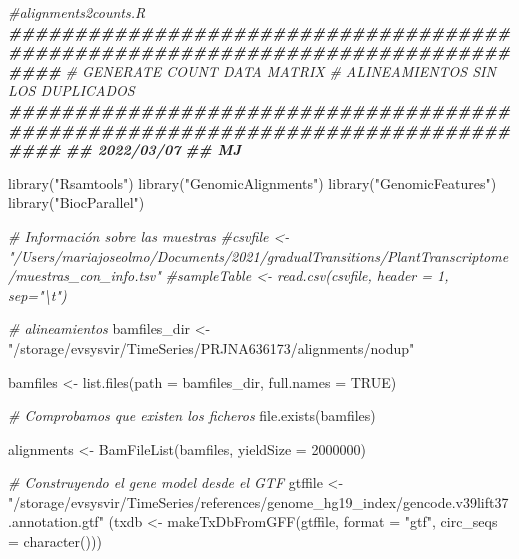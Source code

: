 \documentclass[
]{book}
\newenvironment{Shaded}{\begin{snugshade}}{\end{snugshade}}
\newcommand{\AttributeTok}[1]{\textcolor[rgb]{0.77,0.63,0.00}{#1}}
\newcommand{\CommentTok}[1]{\textcolor[rgb]{0.56,0.35,0.01}{\textit{#1}}}
\newcommand{\ConstantTok}[1]{\textcolor[rgb]{0.00,0.00,0.00}{#1}}
\newcommand{\DecValTok}[1]{\textcolor[rgb]{0.00,0.00,0.81}{#1}}
\newcommand{\DocumentationTok}[1]{\textcolor[rgb]{0.56,0.35,0.01}{\textbf{\textit{#1}}}}
\newcommand{\FunctionTok}[1]{\textcolor[rgb]{0.00,0.00,0.00}{#1}}
\newcommand{\NormalTok}[1]{#1}
\newcommand{\OtherTok}[1]{\textcolor[rgb]{0.56,0.35,0.01}{#1}}
\newcommand{\StringTok}[1]{\textcolor[rgb]{0.31,0.60,0.02}{#1}}
\begin{document}
\begin{Shaded}
\begin{Highlighting}[]
\CommentTok{\#alignments2counts.R}
\DocumentationTok{\#\#\#\#\#\#\#\#\#\#\#\#\#\#\#\#\#\#\#\#\#\#\#\#\#\#\#\#\#\#\#\#\#\#\#\#\#\#\#\#\#\#\#\#\#\#\#\#\#\#\#\#\#\#\#\#\#\#\#\#\#\#\#\#\#\#\#\#\#\#\#\#\#\#\#\#\#\#\#\#}
\CommentTok{\# GENERATE COUNT DATA MATRIX}
\CommentTok{\# ALINEAMIENTOS SIN LOS DUPLICADOS}
\DocumentationTok{\#\#\#\#\#\#\#\#\#\#\#\#\#\#\#\#\#\#\#\#\#\#\#\#\#\#\#\#\#\#\#\#\#\#\#\#\#\#\#\#\#\#\#\#\#\#\#\#\#\#\#\#\#\#\#\#\#\#\#\#\#\#\#\#\#\#\#\#\#\#\#\#\#\#\#\#\#\#\#\#}
\DocumentationTok{\#\# 2022/03/07}
\DocumentationTok{\#\# MJ}

\FunctionTok{library}\NormalTok{(}\StringTok{"Rsamtools"}\NormalTok{)}
\FunctionTok{library}\NormalTok{(}\StringTok{"GenomicAlignments"}\NormalTok{)}
\FunctionTok{library}\NormalTok{(}\StringTok{"GenomicFeatures"}\NormalTok{)}
\FunctionTok{library}\NormalTok{(}\StringTok{"BiocParallel"}\NormalTok{)}

\CommentTok{\# Información sobre las muestras}
\CommentTok{\#csvfile \textless{}{-} "/Users/mariajoseolmo/Documents/2021/gradualTransitions/PlantTranscriptome/muestras\_con\_info.tsv"}
\CommentTok{\#sampleTable \textless{}{-} read.csv(csvfile, header = 1, sep="\textbackslash{}t")}

\CommentTok{\# alineamientos}
\NormalTok{bamfiles\_dir }\OtherTok{\textless{}{-}} \StringTok{"/storage/evsysvir/TimeSeries/PRJNA636173/alignments/nodup"}

\NormalTok{bamfiles }\OtherTok{\textless{}{-}} \FunctionTok{list.files}\NormalTok{(}\AttributeTok{path =}\NormalTok{ bamfiles\_dir, }\AttributeTok{full.names =} \ConstantTok{TRUE}\NormalTok{)}

\CommentTok{\# Comprobamos que existen los ficheros}
\FunctionTok{file.exists}\NormalTok{(bamfiles)}

\NormalTok{alignments }\OtherTok{\textless{}{-}} \FunctionTok{BamFileList}\NormalTok{(bamfiles,}
                          \AttributeTok{yieldSize =} \DecValTok{2000000}\NormalTok{)}


\CommentTok{\# Construyendo el gene model desde el GTF}
\NormalTok{gtffile }\OtherTok{\textless{}{-}} \StringTok{"/storage/evsysvir/TimeSeries/references/genome\_hg19\_index/gencode.v39lift37.annotation.gtf"}
\NormalTok{(txdb }\OtherTok{\textless{}{-}} \FunctionTok{makeTxDbFromGFF}\NormalTok{(gtffile,}
                         \AttributeTok{format =} \StringTok{"gtf"}\NormalTok{,}
                         \AttributeTok{circ\_seqs =} \FunctionTok{character}\NormalTok{()))}


\end{Highlighting}
\end{Shaded}
\end{document}
